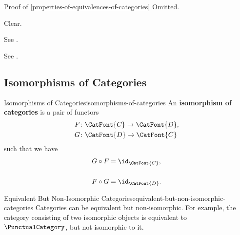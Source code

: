\begin{Proof}{Proof of \cref{properties-of-equivalences-of-categories}}
    Omitted.

    Clear.

    See \cite[Proposition 4.4.5]{riehl:context}.

    See \cite[Proposition 4.4]{nlab:groupoid}.
\end{Proof}
\subsection{Isomorphisms of Categories}\label{subsection-isomorphisms-of-categories}
\begin{definition}{Isomorphisms of Categories}{isomorphisms-of-categories}%
    An \textbf{isomorphism of categories} is a pair of functors
    \begin{align*}
        F &\colon \CatFont{C}\to\CatFont{D},\\
        G &\colon \CatFont{D}\to\CatFont{C}
    \end{align*}
    such that we have
    \begin{align*}
        G\circ F &= \id_{\CatFont{C}},\\\\
        F\circ G &= \id_{\CatFont{D}}.
    \end{align*}
\end{definition}
\begin{example}{Equivalent But Non-Isomorphic Categories}{equivalent-but-non-isomorphic-categories}%
    Categories can be equivalent but non-isomorphic. For example, the category consisting of two isomorphic objects is equivalent to $\PunctualCategory$, but not isomorphic to it.
\end{example}
